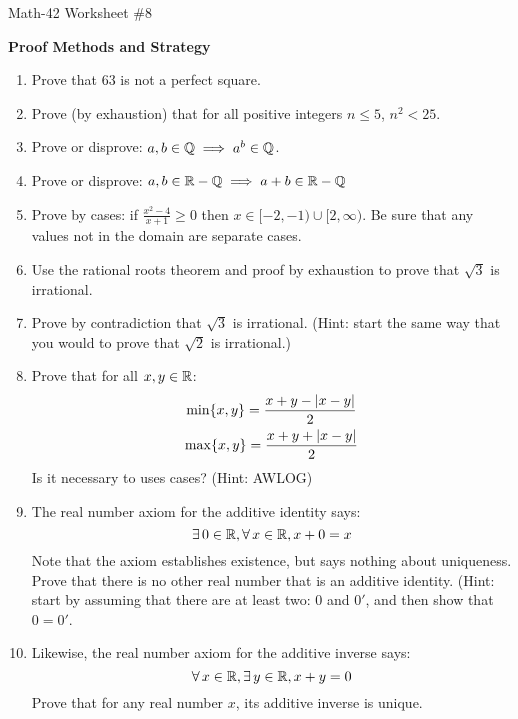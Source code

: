 \documentclass[letterpaper,12pt,fleqn]{article}
\begin{document}
\begin{center}
  \large Math-42 Worksheet \#8

  \textbf{Proof Methods and Strategy}
\end{center}

\vspace{0.5in}

\begin{enumerate}[left=0in,itemsep=0.5in]
\item Prove that \(63\) is not a perfect square.

\item Prove (by exhaustion) that for all positive integers \(n\le5\), \(n^2<25\).

\item Prove or disprove: \(a,b\in\mathbb{Q}\implies a^b\in\mathbb{Q}\).

\item Prove or disprove: \(a,b\in\mathbb{R}-\mathbb{Q}\implies a+b\in\mathbb{R}-\mathbb{Q}\)

\item Prove by cases: if \(\displaystyle\frac{x^2-4}{x+1}\ge0\) then \(x\in[-2,-1)\cup[2,\infty)\).  Be sure that
    any values not in the domain are separate cases.

\item Use the rational roots theorem and proof by exhaustion to prove that \(\sqrt{3}\) is irrational.

\item Prove by contradiction that \(\sqrt{3}\) is irrational.  (Hint: start the same way that you would to prove
  that \(\sqrt{2}\) is irrational.)

\item Prove that for all \(x,y\in\mathbb{R}\):
  \begin{gather*}
    \min\{x,y\}=\frac{x+y-\lvert x-y\rvert}{2} \\
    \max\{x,y\}=\frac{x+y+\lvert x-y\rvert}{2}
  \end{gather*}
  Is it necessary to uses cases? (Hint: AWLOG)

\item The real number axiom for the additive identity says:
  \[\exists\,0\in\mathbb{R},\forall\,x\in\mathbb{R},x+0=x\]
  Note that the axiom establishes existence, but says nothing about uniqueness.  Prove that there is no other real
  number that is an additive identity.  (Hint: start by assuming that there are at least two: \(0\) and \(0'\), and
  then show that \(0=0'\).

\item Likewise, the real number axiom for the additive inverse says:
  \[\forall\,x\in\mathbb{R},\exists\,y\in\mathbb{R},x+y=0\]
  Prove that for any real number \(x\), its additive inverse is unique.
\end{enumerate}
\end{document}
